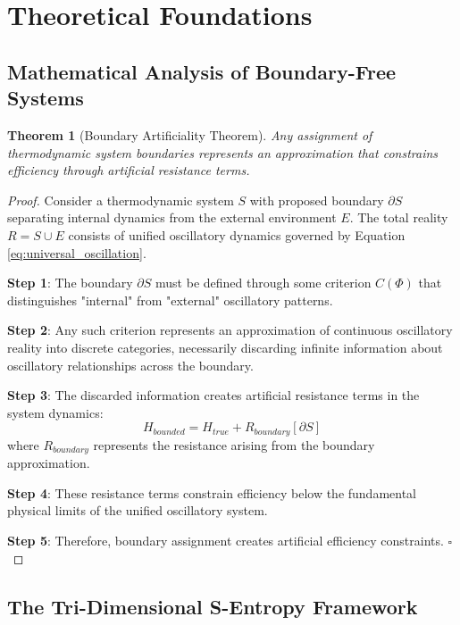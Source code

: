 \documentclass[11pt,a4paper]{article}
\newtheorem{theorem}{Theorem}[section]
\theoremstyle{remark}
\begin{document}
\section{Theoretical Foundations}

\subsection{Mathematical Analysis of Boundary-Free Systems}

\begin{theorem}[Boundary Artificiality Theorem]
Any assignment of thermodynamic system boundaries represents an approximation that constrains efficiency through artificial resistance terms.
\end{theorem}

\begin{proof}
Consider a thermodynamic system $S$ with proposed boundary $\partial S$ separating internal dynamics from the external environment $E$. The total reality $R = S \cup E$ consists of unified oscillatory dynamics governed by Equation \ref{eq:universal_oscillation}.

\textbf{Step 1}: The boundary $\partial S$ must be defined through some criterion $C(\Phi)$ that distinguishes "internal" from "external" oscillatory patterns.

\textbf{Step 2}: Any such criterion represents an approximation of continuous oscillatory reality into discrete categories, necessarily discarding infinite information about oscillatory relationships across the boundary.

\textbf{Step 3}: The discarded information creates artificial resistance terms in the system dynamics:
\begin{equation}
H_{bounded} = H_{true} + R_{boundary}[\partial S]
\end{equation}
where $R_{boundary}$ represents the resistance arising from the boundary approximation.

\textbf{Step 4}: These resistance terms constrain efficiency below the fundamental physical limits of the unified oscillatory system.

\textbf{Step 5}: Therefore, boundary assignment creates artificial efficiency constraints. $\square$
\end{proof}

\subsection{The Tri-Dimensional S-Entropy Framework}
\end{document}
